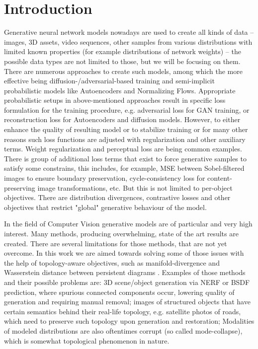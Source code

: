 \chapter{Introduction}

Generative neural network models nowadays are used to create all kinds of data -- images, 3D assets, video sequences, other samples from various distributions with limited known properties (for example distributions of network weights) -- the possible data types are not limited to those, but we will be focusing on them. There are numerous approaches to create such models, among which the more effective being diffusion-/adversarial-based training and semi-implicit probabilistic models like Autoencoders and Normalizing Flows. Appropriate probabilistic setups in above-mentioned approaches result in specific loss formulation for the training procedure, e.g. adversarial loss for GAN training, or reconstruction loss for Autoencoders and diffusion models. However, to either enhance the quality of resulting model or to stabilize training or for many other reasons such loss functions are adjusted with regularization and other auxiliary terms. Weight regularization and perceptual loss are being common examples. There is group of additional loss terms that exist to force generative samples to satisfy some constrains, this includes, for example, MSE between Sobel-filtered images to ensure boundary preservation, cycle-consistency loss for content-preserving image transformations, etc. But this is not limited to per-object objectives. There are distribution divergences, contrastive losses and other objectives that restrict "global" generative behaviour of the model.

In the field of Computer Vision generative models are of particular and very high interest. Many methods, producing overwhelming, state of the art results are created. There are several limitations for those methods, that are not yet overcome. In this work we are aimed towards solving some of those issues with the help of topology-aware objectives, such as manifold-divergence \cite{MTopDiv} and Wasserstein distance between persistent diagrams \cite{Bar94, topo-segm}. Examples of those methods and their possible problems are: 3D scene/object generation via NERF or BSDF prediction, where spurious connected components occur, lowering quality of generation and requiring manual removal; images of structured objects that have certain semantics behind their real-life topology, e.g. satellite photos of roads, which need to preserve such topology upon generation and restoration; Modalities of modeled distributions are also oftentimes corrupt (so called mode-collapse), which is somewhat topological phenomenon in nature.

